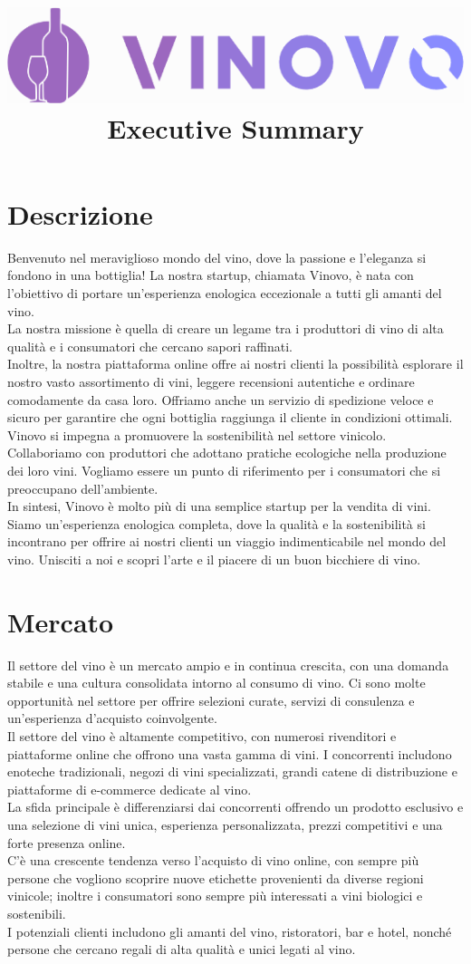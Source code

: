 \documentclass[12pt, a4paper]{article}
\title{
    \includegraphics[width=.8\textwidth]{images/LOGO.png}\\
    \textbf{Executive Summary}
}
\date{}
\author{}
\newcommand{\meskip}{\medskip \\}
\begin{document}
\maketitle

\section*{Descrizione}
Benvenuto nel meraviglioso mondo del vino, dove la passione e l'eleganza si fondono in una bottiglia! La nostra startup, chiamata Vinovo, è nata con l'obiettivo di portare un'esperienza enologica eccezionale a tutti gli amanti del vino. \meskip
La nostra missione è quella di creare un legame tra i produttori di vino di alta qualità e i consumatori che cercano sapori raffinati.\meskip
Inoltre, la nostra piattaforma online offre ai nostri clienti la possibilità esplorare il nostro vasto assortimento di vini, leggere recensioni autentiche e ordinare comodamente da casa loro.
Offriamo anche un servizio di spedizione veloce e sicuro per garantire che ogni bottiglia raggiunga il cliente in condizioni ottimali.\meskip
Vinovo si impegna a promuovere la sostenibilità nel settore vinicolo.
Collaboriamo con produttori che adottano pratiche ecologiche nella produzione dei loro vini.
Vogliamo essere un punto di riferimento per i consumatori che si preoccupano dell'ambiente.\meskip
In sintesi, Vinovo è molto più di una semplice startup per la vendita di vini.
Siamo un'esperienza enologica completa, dove la qualità e la sostenibilità si incontrano per offrire ai nostri clienti un viaggio indimenticabile nel mondo del vino.
Unisciti a noi e scopri l'arte e il piacere di un buon bicchiere di vino.

\section*{Mercato}
Il settore del vino è un mercato ampio e in continua crescita, con una domanda stabile e una cultura consolidata intorno al consumo di vino.
Ci sono molte opportunità nel settore per offrire selezioni curate, servizi di consulenza e un'esperienza d'acquisto coinvolgente.\meskip
Il settore del vino è altamente competitivo, con numerosi rivenditori e piattaforme online che offrono una vasta gamma di vini.
I concorrenti includono enoteche tradizionali, negozi di vini specializzati, grandi catene di distribuzione e piattaforme di e-commerce dedicate al vino.\meskip
La sfida principale è differenziarsi dai concorrenti offrendo un prodotto esclusivo e una selezione di vini unica, esperienza personalizzata, prezzi competitivi e una forte presenza online.\meskip
C'è una crescente tendenza verso l'acquisto di vino online, con sempre più persone che vogliono scoprire nuove etichette provenienti da diverse regioni vinicole; inoltre i consumatori sono sempre più interessati a vini biologici e sostenibili.\meskip
I potenziali clienti includono gli amanti del vino, ristoratori, bar e hotel, nonché persone che cercano regali di alta qualità e unici legati al vino.
\newpage
\end{document}
